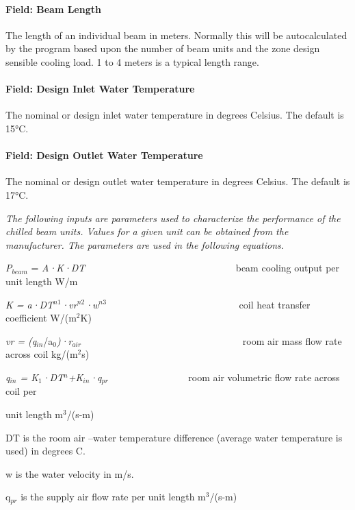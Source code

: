 \paragraph{Field: Beam Length}\label{field-beam-length}

The length of an individual beam in meters. Normally this will be autocalculated by the program based upon the number of beam units and the zone design sensible cooling load. 1 to 4 meters is a typical length range.

\paragraph{Field: Design Inlet Water Temperature}\label{field-design-inlet-water-temperature}

The nominal or design inlet water temperature in degrees Celsius. The default is 15°C.

\paragraph{Field: Design Outlet Water Temperature}\label{field-design-outlet-water-temperature}

The nominal or design outlet water temperature in degrees Celsius. The default is 17°C.

\emph{The following inputs are parameters used to characterize the performance of the chilled beam units. Values for a given unit can be obtained from the manufacturer. The parameters are used in the following equations.~~~~~}

\emph{P\(_{beam}\)} = \emph{A·K·DT~~~~~~~} ~~~~~~~~~~~~~~~~~~~~~~~ beam cooling output per unit length W/m

\emph{K = a·DT\(^{n1}\)·vr\(^{n2}\)·w\(^{n3}\)}~~~~~~~~~~~~~~~~~~~~~~~~~~~ coil heat transfer coefficient W/(m\(^{2}\)K)

\emph{vr = (q\(_{in}\)}/a\emph{\(_{0}\))·r\(_{air}\)}~~~~~~~~~~~~~~~~~~~~~~~~~~~~~~~~~ room air mass flow rate across coil kg/(m\(^{2}\)s)

\emph{q\(_{in}\) = K\(_{1}\)·DT\(^{n}\)+K\(_{in}\)·q\(_{pr}\)}~~~~~~~~~~~~~~~~ room air volumetric flow rate across coil per

unit length m\(^{3}\)/(s-m)

DT is the room air --water temperature difference (average water temperature is used) in degrees C.

w is the water velocity in m/s.

q\(_{pr}\) is the supply air flow rate per unit length m\(^{3}\)/(s-m)

